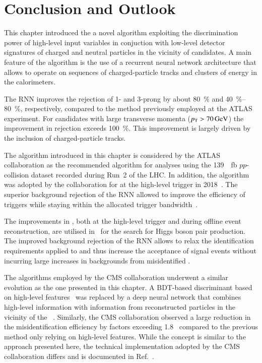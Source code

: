 \section{Conclusion and Outlook}%
\label{sec:tauid_conclusion}

This chapter introduced the a novel \tauid algorithm exploiting the
discrimination power of high-level input variables in conjuction with
low-level detector signatures of charged and neutral particles in the
vicinity of \tauhadvis candidates. A main feature of the algorithm is
the use of a recurrent neural network architecture that allows to
operate on sequences of charged-particle tracks and clusters of energy
in the calorimeters.

The RNN \tauid improves the rejection of 1- and 3-prong \faketauhadvis
by about \SI{80}{\percent} and \SIrange{40}{80}{\percent},
respectively, compared to the method previously employed at the ATLAS
experiment. For \tauhadvis candidates with large transverse momenta
($\pT > \SI{70}{\GeV}$) the improvement in \faketauhadvis rejection
exceeds \SI{100}{\percent}. This improvement is largely driven by the
inclusion of charged-particle tracks.

The \tauid algorithm introduced in this chapter is considered by the
ATLAS collaboration as the recommended algorithm for analyses using
the \SI{139}{\per\femto\barn} $pp$-collision dataset recorded during
Run~2 of the LHC. In addition, the algorithm was adopted by the
collaboration for \tauid at the high-level trigger in
2018~\cite{ATL-DAQ-PUB-2019-001}. The superior background rejection of
the RNN \tauid allowed to improve the efficiency of \tauhadvis
triggers while staying within the allocated trigger
bandwidth~\cite{ATL-DAQ-PUB-2019-001}.

The improvements in \tauid, both at the high-level trigger and during
offline event reconstruction, are utilised in~ for
the search for Higgs boson pair production. The improved background
rejection of the RNN allows to relax the identification requirements
applied to \tauhadvis and thus increase the acceptance of signal
events without incurring large increases in backgrounds from
misidentified \tauhadvis.

The \tauid algorithms employed by the CMS collaboration underwent a
similar evolution as the one presented in this chapter. A BDT-based
discriminant based on high-level features~\cite{CMS-TAU-16-003} was
replaced by a deep neural network that combines high-level information
with information from reconstructed particles in the vicinity of the
\tauhadvis~\cite{CMS-TAU-20-001}. Similarly, the CMS collaboration
observed a large reduction in the \faketauhadvis misidentification
efficiency by factors exceeding 1.8~\cite{CMS-TAU-20-001} compared to
the previous method only relying on high-level features. While the
concept is similar to the approach presented here, the technical
implementation adopted by the CMS collaboration differs and is
documented in Ref.~\cite{CMS-TAU-20-001}.


